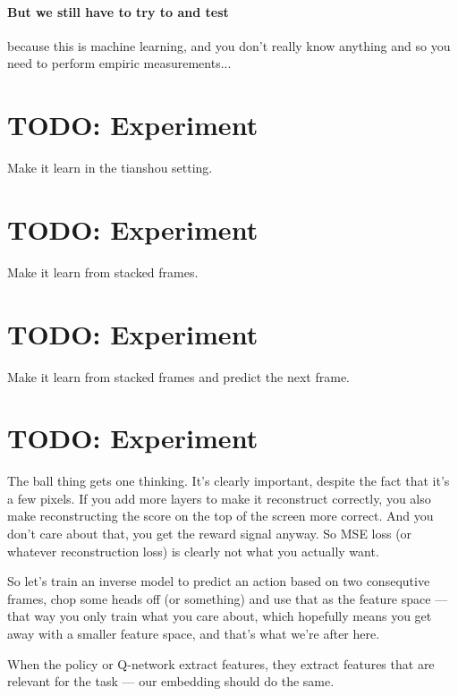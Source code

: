 \documentclass{article}
\begin{document}
\paragraph{But we still have to try to and test} because this is machine learning,
and you don't really know anything and so you need to perform empiric measurements...


\section{TODO: Experiment}
Make it learn in the tianshou setting.

\section{TODO: Experiment}
Make it learn from stacked frames.


\section{TODO: Experiment}
Make it learn from stacked frames and predict the next frame.

\section{TODO: Experiment}
The ball thing gets one thinking.
It's clearly important, despite the fact that it's a few pixels.
If you add more layers to make it reconstruct correctly, 
you also make reconstructing the score on the top of the screen more correct. 
And you don't care about that, you get the reward signal anyway.
So MSE loss (or whatever reconstruction loss) is clearly not what you actually want.

So let's train an inverse model to predict an action based on two consequtive frames,
chop some heads off (or something) and use that as the feature space --- 
that way you only train what you care about, which hopefully
means you get away with a smaller feature space,
and that's what we're after here.

When the policy or Q-network extract features, they extract features that are relevant 
for the task --- our embedding should do the same.
\end{document}
